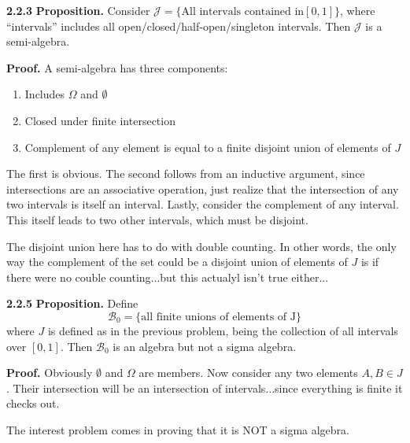 \documentclass{article}
\begin{document}
\noindent \textbf{2.2.3} \textbf{Proposition.} Consider $\mathcal{J} = \{ \text{All intervals contained in} [0,1] \}$, where ``intervals'' includes all open/closed/half-open/singleton intervals. Then $\mathcal{J}$ is a semi-algebra. 

\medskip

\noindent \textbf{Proof.} A semi-algebra has three components:

\begin{enumerate}

\item Includes $\Omega$ and $\emptyset$

\item Closed under finite intersection

\item Complement of any element is equal to a finite disjoint union of elements of $J$

\end{enumerate}

The first is obvious. The second follows from an inductive argument, since intersections are an associative operation, just realize that the intersection of any two intervals is itself an interval. Lastly, consider the complement of any interval. This itself leads to two other intervals, which must be disjoint. 

The disjoint union here has to do with double counting. In other words, the only way the complement of the set could be a disjoint union of elements of $J$ is if there were no couble counting...but this actualyl isn't true either...

\bigskip

\noindent \textbf{2.2.5} \textbf{Proposition.} Define \[\mathcal{B}_0 = \{\text{all finite unions of elements of J}\}\] where $J$ is defined as in the previous problem, being the collection of all intervals over $[0,1]$. Then $\mathcal{B}_0$ is an algebra but not a sigma algebra.

\medskip

\noindent \textbf{Proof.} Obviously $\emptyset$ and $\Omega$ are members. Now consider any two elements $A, B \in J$. Their intersection will be an intersection of intervals...since everything is finite it checks out.

The interest problem comes in proving that it is NOT a sigma algebra. 
\end{document}
